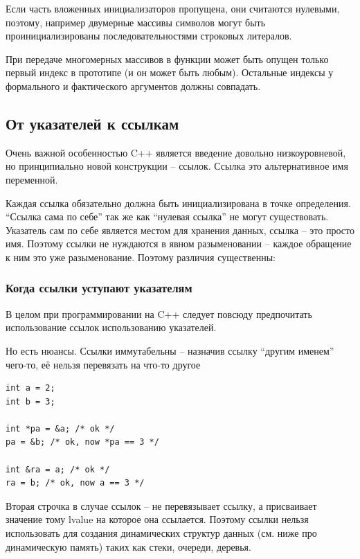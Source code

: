 \documentclass[a4paper,12pt,oneside]{article}
\begin{document}
Если часть вложенных инициализаторов пропущена, они считаются нулевыми, поэтому, например двумерные массивы символов могут быть проинициализированы последовательностями строковых литералов.

При передаче многомерных массивов в функции может быть опущен только первый индекс в прототипе (и он может быть любым). Остальные индексы у формального и фактического аргументов должны совпадать.

\subsection{От указателей к ссылкам}

Очень важной особенностью C++ является введение довольно низкоуровневой, но принципиально новой конструкции – ссылок. Ссылка это альтернативное имя переменной.



Каждая ссылка обязательно должна быть инициализирована в точке определения. ``Ссылка сама по себе'' так же как ``нулевая ссылка'' не могут существовать. Указатель сам по себе является местом для хранения данных, ссылка – это просто имя. Поэтому ссылки не нуждаются в явном разыменовании – каждое обращение к ним это уже разыменование. Поэтому различия существенны:



\subsubsection{Когда ссылки уступают указателям}

В целом при программировании на C++ следует повсюду предпочитать использование ссылок использованию указателей.

Но есть нюансы. Ссылки иммутабельны -- назначив ссылку ``другим именем'' чего-то, её нельзя перевязать на что-то другое

\begin{lstlisting}
int a = 2;
int b = 3;

int *pa = &a; /* ok */
pa = &b; /* ok, now *pa == 3 */

int &ra = a; /* ok */
ra = b; /* ok, now a == 3 */
\end{lstlisting}

Вторая строчка в случае ссылок -- не перевязывает ссылку, а присваивает значение тому lvalue на которое она ссылается. Поэтому ссылки нельзя использовать для создания динамических структур данных (см. ниже про динамическую память) таких как стеки, очереди, деревья.
\end{document}
